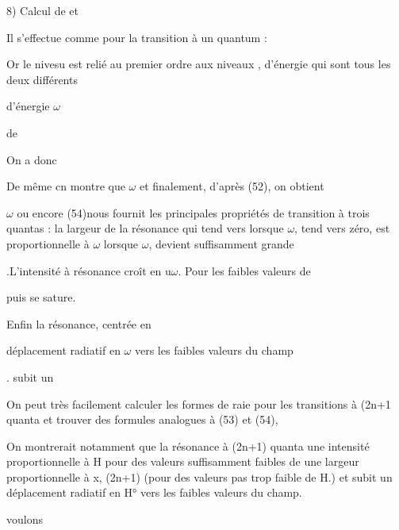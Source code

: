 8) Calcul de  et 

Il s'effectue comme pour la transition à un quantum :


Or le nivesu  est relié au premier ordre aux
niveaux , d'énergie  qui sont tous les deux différents

d'énergie $\omega$

de

On a donc

De même cn montre que
$\omega$
et finalement, d'après (52), on obtient

$\omega$
ou encore
(54)nous fournit les principales propriétés de  transition à trois quantas :
la largeur de la résonance  qui tend vers  lorsque
$\omega$, tend vers zéro, est proportionnelle à $\omega$  lorsque $\omega$, devient suffisamment grande


.L'intensité à résonance croît en u$\omega$. Pour les faibles valeurs de

puis se sature.

Enfin la résonance, centrée en 

déplacement radiatif en $\omega$ vers les faibles valeurs du champ

. subit un

On peut très facilement calculer les formes de raie pour les transitions à (2n+1 quanta et trouver des formules analogues à (53) et (54),

On montrerait notamment que la résonance à (2n+1) quanta  une intensité
proportionnelle à H pour des valeurs suffisamment faibles de  une
largeur proportionnelle à x, (2n+1) (pour des valeurs pas trop faible de H.)
et subit un déplacement radiatif en H° vers les faibles valeurs du champ.

voulons

